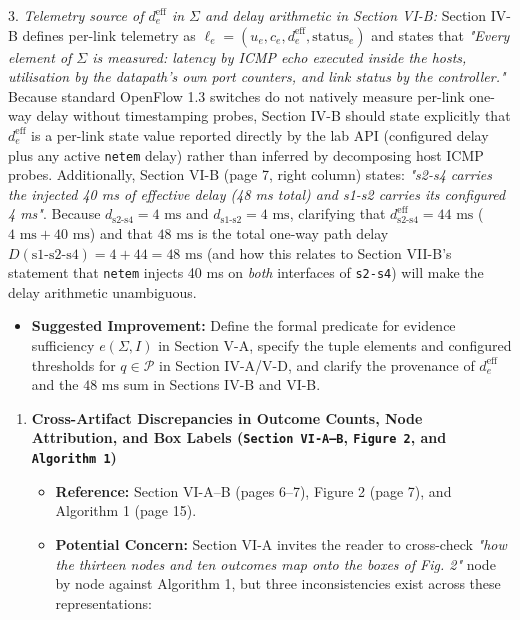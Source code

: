 \documentclass[11pt,a4paper]{article}
\begin{document}
3. \emph{Telemetry source of $d_e^{\text{eff}}$ in $\Sigma$ and delay arithmetic in Section VI-B:} Section IV-B defines per-link telemetry as $\ell_e = (u_e, c_e, d_e^{\text{eff}}, \text{status}_e)$ and states that \emph{"Every element of $\Sigma$ is measured: latency by ICMP echo executed inside the hosts, utilisation by the datapath's own port counters, and link status by the controller."} Because standard OpenFlow 1.3 switches do not natively measure per-link one-way delay without timestamping probes, Section IV-B should state explicitly that $d_e^{\text{eff}}$ is a per-link state value reported directly by the lab API (configured delay plus any active \texttt{netem} delay) rather than inferred by decomposing host ICMP probes. Additionally, Section VI-B (page 7, right column) states: \emph{"s2-s4 carries the injected 40 ms of effective delay (48 ms total) and s1-s2 carries its configured 4 ms"}. Because $d_{\text{s2-s4}} = 4\text{ ms}$ and $d_{\text{s1-s2}} = 4\text{ ms}$, clarifying that $d_{\text{s2-s4}}^{\text{eff}} = 44\text{ ms}$ ($4\text{ ms} + 40\text{ ms}$) and that $48\text{ ms}$ is the total one-way path delay $D(\text{s1-s2-s4}) = 4 + 44 = 48\text{ ms}$ (and how this relates to Section VII-B's statement that \texttt{netem} injects 40 ms on \emph{both} interfaces of \texttt{s2-s4}) will make the delay arithmetic unambiguous.
\begin{itemize}[leftmargin=1.8em,itemsep=2pt]
\item \textbf{Suggested Improvement:} Define the formal predicate for evidence sufficiency $e(\Sigma, I)$ in Section V-A, specify the tuple elements and configured thresholds for $q \in \mathcal{P}$ in Section IV-A/V-D, and clarify the provenance of $d_e^{\text{eff}}$ and the $48\text{ ms}$ sum in Sections IV-B and VI-B.
\end{itemize}
\begin{enumerate}[leftmargin=1.6em,itemsep=3pt]
\item \textbf{Cross-Artifact Discrepancies in Outcome Counts, Node Attribution, and Box Labels (\texttt{Section VI-A–B}, \texttt{Figure 2}, and \texttt{Algorithm 1})}
\begin{itemize}[leftmargin=1.8em,itemsep=2pt]
\item \textbf{Reference:} Section VI-A–B (pages 6–7), Figure 2 (page 7), and Algorithm 1 (page 15).
\item \textbf{Potential Concern:} Section VI-A invites the reader to cross-check \emph{"how the thirteen nodes and ten outcomes map onto the boxes of Fig. 2"} node by node against Algorithm 1, but three inconsistencies exist across these representations:
\end{itemize}
\end{enumerate}
\end{document}
